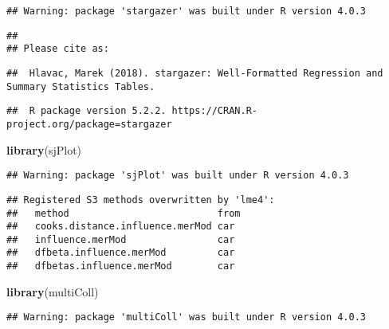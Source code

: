 \documentclass[
]{article}
\newenvironment{Shaded}{\begin{snugshade}}{\end{snugshade}}
\newcommand{\KeywordTok}[1]{\textcolor[rgb]{0.13,0.29,0.53}{\textbf{#1}}}
\newcommand{\NormalTok}[1]{#1}
\begin{document}
\begin{verbatim}
## Warning: package 'stargazer' was built under R version 4.0.3
\end{verbatim}

\begin{verbatim}
## 
## Please cite as:
\end{verbatim}

\begin{verbatim}
##  Hlavac, Marek (2018). stargazer: Well-Formatted Regression and Summary Statistics Tables.
\end{verbatim}

\begin{verbatim}
##  R package version 5.2.2. https://CRAN.R-project.org/package=stargazer
\end{verbatim}

\begin{Shaded}
\begin{Highlighting}[]
\KeywordTok{library}\NormalTok{(sjPlot)}
\end{Highlighting}
\end{Shaded}

\begin{verbatim}
## Warning: package 'sjPlot' was built under R version 4.0.3
\end{verbatim}

\begin{verbatim}
## Registered S3 methods overwritten by 'lme4':
##   method                          from
##   cooks.distance.influence.merMod car 
##   influence.merMod                car 
##   dfbeta.influence.merMod         car 
##   dfbetas.influence.merMod        car
\end{verbatim}

\begin{Shaded}
\begin{Highlighting}[]
\KeywordTok{library}\NormalTok{(multiColl)}
\end{Highlighting}
\end{Shaded}

\begin{verbatim}
## Warning: package 'multiColl' was built under R version 4.0.3
\end{verbatim}
\end{document}
